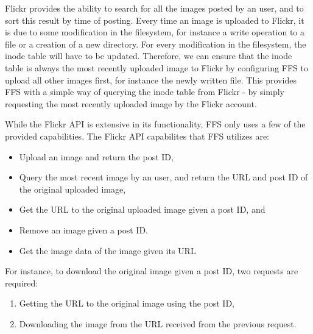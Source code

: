 Flickr provides the ability to search for all the images posted by an user, and to sort this result by time of posting. Every time an image is uploaded to Flickr, it is due to some modification in the filesystem, for instance a write operation to a file or a creation of a new directory. For every modification in the filesystem, the inode table will have to be updated. Therefore, we can ensure that the inode table is always the most recently uploaded image to Flickr by configuring FFS to upload all other images first, for instance the newly written file. This provides FFS with a simple way of querying the inode table from Flickr - by simply requesting the most recently uploaded image by the Flickr account.

While the Flickr API is extensive in its functionality, FFS only uses a few of the provided capabilities. The Flickr API capabilites that FFS utilizes are:
\begin{itemize}
	\item Upload an image and return the post ID,
	\item Query the most recent image by an user, and return the URL and post ID of the original uploaded image,
	\item Get the URL to the original uploaded image given a post ID, and
	\item Remove an image given a post ID.
	\item Get the image data of the image given its URL
\end{itemize}

For instance, to download the original image given a post ID, two requests are required:
\begin{enumerate}
	\item Getting the URL to the original image using the post ID,
	\item Downloading the image from the URL received from the previous request.
\end{enumerate}

